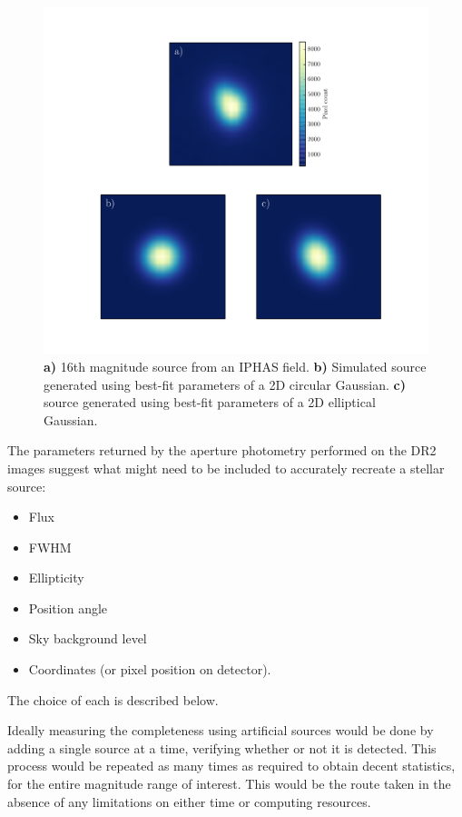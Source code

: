 \documentclass[a4paper,useAMS,usenatbib]{mn2e}
\begin{document}
\begin{figure}
\begin{center}
\includegraphics[width=1.0\linewidth]{figures/fitting_profiles.pdf} 
\caption{\footnotesize \textbf{a)} 16th magnitude source from an IPHAS field. 
\textbf{b)} Simulated source generated using best-fit parameters of a 2D 
circular Gaussian. \textbf{c)} source generated using best-fit parameters of 
a 2D elliptical Gaussian.}
\label{fig:fitting_profiles}
\end{center}
\end{figure}

The parameters returned by the aperture photometry performed on the DR2 images suggest what might need to be included to accurately recreate a stellar source:
\begin{itemize}\itemsep
\item Flux
\item FWHM
\item Ellipticity
\item Position angle
\item Sky background level
\item Coordinates (or pixel position on detector).
\end{itemize}
\noindent The choice of each is described below.

Ideally measuring the completeness using artificial sources would be done by adding a single source at a time, verifying whether or not it is detected. This process would be repeated as many times as required to obtain decent statistics, for the entire magnitude range of interest. This would be the route taken in the absence of any limitations on either time or computing resources.
\end{document}
